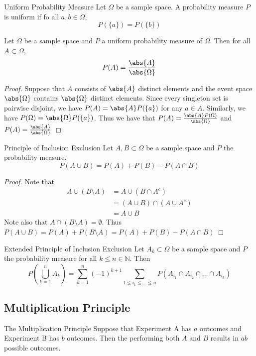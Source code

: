 \documentclass[a4paper]{article}
\begin{document}
\begin{defn}{Uniform Probability Measure}{} Let $\Omega$ be a sample space. A probability measure $P$ is uniform if fo all $a,b\in\Omega$, $$P(\{a\})=P(\{b\})$$
\end{defn}

\begin{thm}{}{} Let $\Omega$ be a sample space and $P$ a uniform probability measure of $\Omega$. Then for all $A\subset\Omega$, $$P(A)=\frac{\abs{A}}{\abs{\Omega}}$$
\end{thm}
\begin{proof} Suppose that $A$ consists of $\abs{A}$ distinct elements and the event space $\abs{\Omega}$ contains $\abs{\Omega}$ distinct elements. Since every singleton set is pairwise disjoint, we have $P(A)=\abs{A}P(\{a\})$ for any $a\in A$. Similarly, we have $P(\Omega)=\abs{\Omega}P(\{a\})$.  Thus we have that $P(A)=\frac{\abs{A}P(\Omega)}{\abs{\Omega}}$ and $P(A)=\frac{\abs{A}}{\abs{\Omega}}$
\end{proof}

\begin{thm}{Principle of Inclusion Exclusion}{} Let $A,B\subset\Omega$ be a sample space and $P$ the probability measure. $$P(A\cup B)=P(A)+P(B)-P(A\cap B)$$
\end{thm}
\begin{proof} Note that 
\begin{align*}
A\cup(B\setminus A)&=A\cup(B\cap A^c)\\
&=(A\cup B)\cap(A\cup A^c)\\
&=A\cup B
\end{align*} Note also that $A\cap (B\setminus A)=\emptyset$. Thus $P(A\cup B)=P(A)+P(B\setminus A)=P(A)+P(B)-P(A\cap B)$
\end{proof}

\begin{thm}{Extended Principle of Inclusion Exclusion}{} Let $A_k\subset\Omega$ be a sample space and $P$ the probability measure for all $k\leq n\in\mathbb{N}$. Then $$P\left(\bigcup_{k=1}^n A_k\right)=\sum_{k=1}^n(-1)^{k+1}\sum_{1\leq i_1\leq\dots\leq n}P(A_{i_1}\cap A_{i_2}\cap\dots\cap A_{i_k})$$
\end{thm}

\subsection{Multiplication Principle}
\begin{thm}{The Multiplication Principle}{} Suppose that Experiment A has $a$ outcomes and Experiment B has $b$ outcomes. Then the performing both $A$ and $B$ results in $ab$ possible outcomes. 
\end{thm}
\end{document}
